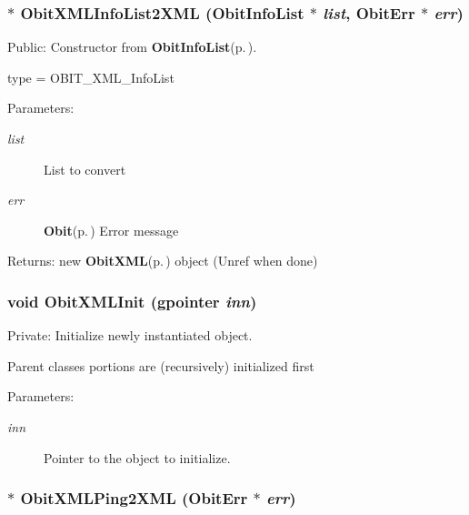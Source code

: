 \subsubsection{$\ast$ Obit\-XMLInfo\-List2XML ({\bf Obit\-Info\-List} $\ast$ {\em list}, {\bf Obit\-Err} $\ast$ {\em err})}\label{ObitXML_8c_a16}


Public: Constructor from {\bf Obit\-Info\-List}{\rm (p.\,\pageref{structObitInfoList})}. 

type = OBIT\_\-XML\_\-Info\-List \begin{Desc}
\item[Parameters:]
\begin{description}
\item[{\em list}]List to convert \item[{\em err}]{\bf Obit}{\rm (p.\,\pageref{structObit})} Error message \end{description}
\end{Desc}
\begin{Desc}
\item[Returns:]new {\bf Obit\-XML}{\rm (p.\,\pageref{structObitXML})} object (Unref when done) \end{Desc}
\subsubsection{\setlength{\rightskip}{0pt plus 5cm}void Obit\-XMLInit (gpointer {\em inn})}\label{ObitXML_8c_a3}


Private: Initialize newly instantiated object. 

Parent classes portions are (recursively) initialized first \begin{Desc}
\item[Parameters:]
\begin{description}
\item[{\em inn}]Pointer to the object to initialize. \end{description}
\end{Desc}
\subsubsection{$\ast$ Obit\-XMLPing2XML ({\bf Obit\-Err} $\ast$ {\em err})}\label{ObitXML_8c_a14}


